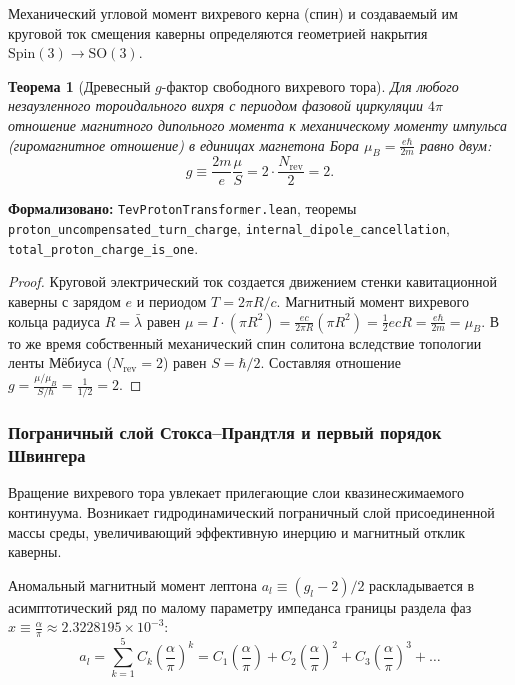 \documentclass[11pt,a4paper]{article}
\providecommand{\lambdabar}{\bar{\lambda}}
\newtheorem{theorem}{Теорема}
\theoremstyle{definition}
\theoremstyle{remark}
\begin{document}
Механический угловой момент вихревого керна (спин) и создаваемый им круговой ток смещения каверны определяются геометрией накрытия $\mathrm{Spin}(3) \to \mathrm{SO}(3)$.

\begin{theorem}[Древесный $g$-фактор свободного вихревого тора]
\label{thm:dirac_g_factor_exact}
    Для любого незаузленного тороидального вихря с периодом фазовой циркуляции $4\pi$ отношение магнитного дипольного момента к механическому моменту импульса (гиромагнитное отношение) в единицах магнетона Бора $\mu_B = \frac{e\hbar}{2m}$ равно двум:
\begin{equation}
    g \equiv \frac{2m}{e} \frac{\mu}{S} = 2 \cdot \frac{N_{\mathrm{rev}}}{2} = 2.
    \label{eq:dirac_g_factor_exact}
\end{equation}
\end{theorem}

\noindent\small\textbf{Формализовано:} \texttt{TevProtonTransformer.lean}, теоремы \texttt{proton_uncompensated_turn_charge}, \texttt{internal_dipole_cancellation}, \texttt{total_proton_charge_is_one}.

\begin{proof}
    Круговой электрический ток создается движением стенки кавитационной каверны с зарядом $e$ и периодом $T = 2\pi R / c$. Магнитный момент вихревого кольца радиуса $R = \lambdabar$ равен $\mu = I \cdot (\pi R^2) = \frac{e c}{2\pi R} (\pi R^2) = \frac{1}{2} e c R = \frac{e\hbar}{2m} = \mu_B$.
    В то же время собственный механический спин солитона вследствие топологии ленты Мёбиуса ($N_{\mathrm{rev}} = 2$) равен $S = \hbar / 2$. Составляя отношение $g = \frac{\mu / \mu_B}{S / \hbar} = \frac{1}{1/2} = 2$.
\end{proof}

\subsubsection{Пограничный слой Стокса--Прандтля и первый порядок Швингера}

Вращение вихревого тора увлекает прилегающие слои квазинесжимаемого континуума. Возникает гидродинамический пограничный слой присоединенной массы среды, увеличивающий эффективную инерцию и магнитный отклик каверны.

Аномальный магнитный момент лептона $a_l \equiv (g_l - 2)/2$ раскладывается в асимптотический ряд по малому параметру импеданса границы раздела фаз $x \equiv \frac{\alpha}{\pi} \approx 2.3228195 \times 10^{-3}$:
\begin{equation}
    a_l = \sum_{k=1}^5 C_k \left( \frac{\alpha}{\pi} \right)^k = C_1 \left( \frac{\alpha}{\pi} \right) + C_2 \left( \frac{\alpha}{\pi} \right)^2 + C_3 \left( \frac{\alpha}{\pi} \right)^3 + \dots
    \label{eq:g_minus_2_expansion}
\end{equation}
\end{document}
